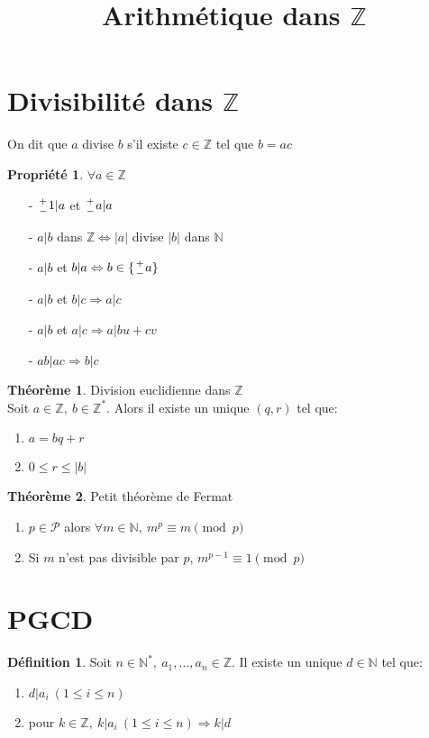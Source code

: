 \documentclass[fleqn]{article}
\title{Arithm\'etique dans $\mathbb{Z}$}
\date{}
\theoremstyle{definition} \newtheorem*{defi}{D\'efinition}
\theoremstyle{definition} \newtheorem*{theo}{Th\'eor\`eme}
\theoremstyle{definition} \newtheorem*{coro}{Corollaire}
\theoremstyle{remark} \newtheorem*{rqs}{Remarques}
\theoremstyle{definition} \newtheorem*{prop}{Propri\'et\'e}
\newcommand*{\bfrac}[2]{\genfrac{}{}{0pt}{}{#1}{#2}}
\begin{document}
\maketitle

\section{Divisibilit\'e dans $\mathbb{Z}$}
On dit que $a$ divise $b$ s'il existe $c \in \mathbb{Z}$ tel que $b=ac$
\begin{prop} $\forall a \in \mathbb{Z}$
	\begin{enumerate}
		\item [-] $\bfrac{+}{-} 1 | a$ et $\bfrac{+}{-} a | a$
		\item [-] $a | b$ dans $\mathbb{Z} \Leftrightarrow |a|$ divise $|b|$ dans $\mathbb{N}$
		\item [-] $a | b$ et $b | a \Leftrightarrow b \in \{\bfrac{+}{-} a\}$
		\item [-] $a|b$ et $b|c \Rightarrow a | c$
		\item [-] $a|b$ et $a|c \Rightarrow a| bu + cv$
		\item [-] $ab |ac \Rightarrow b|c$
	\end{enumerate}
\end{prop}

\begin{theo} Division euclidienne dans $\mathbb{Z}$ \\
Soit $a \in \mathbb{Z},\ b \in \mathbb{Z}^*$. Alors il existe un unique $(q,r)$ tel que:
\begin{enumerate}
	\item $a = bq + r$
	\item $0 \leq r \leq |b|$
\end{enumerate}
\end{theo}

\begin{theo} Petit th\'eor\`eme de Fermat
	\begin{enumerate}
		\item $p \in \mathcal{P}$ alors $\forall m \in \mathbb{N},\ m^p \equiv m \pmod{p}$
		\item Si $m$ n'est pas divisible par $p$, $m^{p-1} \equiv 1 \pmod{p}$
	\end{enumerate}
\end{theo}

\section{PGCD}
\begin{defi}
	Soit $n \in \mathbb{N}^*,\ a_1, \hdots, a_n \in \mathbb{Z}$. Il existe un unique $ d \in \mathbb{N}$ tel que:
	\begin{enumerate}
		\item $d | a_i\ (1 \leq i \leq n)$
		\item pour $k \in \mathbb{Z},\ k | a_i\ (1 \leq i \leq n) \Rightarrow k | d$
	\end{enumerate}
\end{defi}
\end{document}
